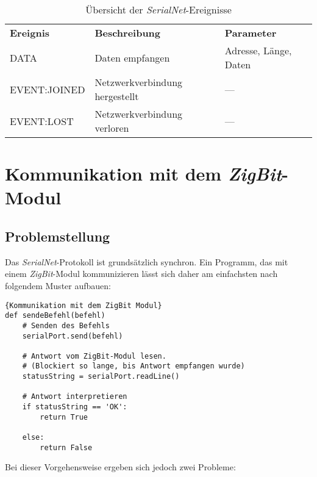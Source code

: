                 \begin{table}
                    \begin{tabular}{lll}
                        \textbf{Ereignis} & \textbf{Beschreibung} & \textbf{Parameter}\\
                            DATA         & Daten empfangen & Adresse, Länge, Daten \\
                            EVENT:JOINED & Netzwerkverbindung hergestellt & --- \\
                            EVENT:LOST   & Netzwerkverbindung verloren & --- \\
                     \end{tabular}
                     \caption{Übersicht der \emph{SerialNet}-Ereignisse}
                     \label{serialnet_events}
                \end{table}


    \section{Kommunikation mit dem \emph{ZigBit}-Modul}\label{analyse_kommunikation_mit_zigbit_modul}
        \subsection{Problemstellung}
            Das \emph{SerialNet}-Protokoll ist grundsätzlich synchron. Ein Programm, das mit
            einem \emph{ZigBit}-Modul kommunizieren lässt sich daher am einfachsten nach folgendem
            Muster aufbauen:

            \begin{lstlisting}{Kommunikation mit dem ZigBit Modul}
def sendeBefehl(befehl)
    # Senden des Befehls
    serialPort.send(befehl)

    # Antwort vom ZigBit-Modul lesen.
    # (Blockiert so lange, bis Antwort empfangen wurde)
    statusString = serialPort.readLine()

    # Antwort interpretieren
    if statusString == 'OK':
        return True
    
    else:
        return False
            \end{lstlisting}
           
        
            Bei dieser Vorgehensweise ergeben sich jedoch zwei Probleme:


